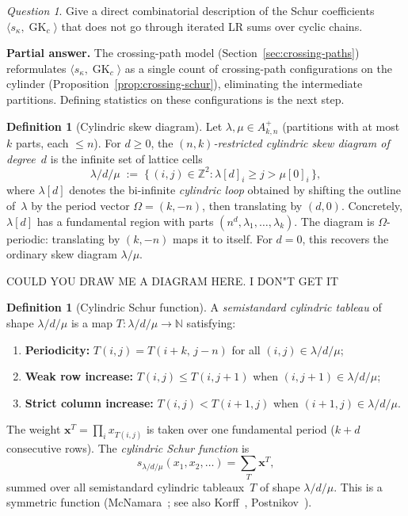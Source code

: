 \documentclass[11pt]{article}
\theoremstyle{plain}
\theoremstyle{definition}
\newtheorem{definition}[theorem]{Definition}
\theoremstyle{remark}
\newtheorem{question}[theorem]{Question}
\newcommand{\N}{\mathbb{N}}
\newcommand{\Z}{\mathbb{Z}}
\newcommand{\GK}{\operatorname{GK}}
\begin{document}
\begin{question}\label{q:schur-coeffs-natural}
Give a direct combinatorial description of the Schur coefficients
$\langle s_\kappa, \GK_c \rangle$ that does not go through
iterated LR sums over cyclic chains.
\end{question}

\noindent
\textbf{Partial answer.}
The crossing-path model (Section~\ref{sec:crossing-paths})
reformulates $\langle s_\kappa, \GK_c \rangle$ as a single
count of crossing-path configurations on the cylinder
(Proposition~\ref{prop:crossing-schur}), eliminating the
intermediate partitions.  Defining statistics on these
configurations is the next step.

\begin{definition}[Cylindric skew diagram]\label{def:cyl-diagram}
Let $\lambda, \mu \in A^+_{k,n}$ (partitions with at most $k$ parts,
each $\leq n$).  For $d \geq 0$, the \emph{$(n,k)$-restricted
cylindric skew diagram of degree~$d$} is the infinite set of
lattice cells
\[
  \lambda/d/\mu
  \;:=\; \bigl\{\, (i,j) \in \Z^2 :
    \lambda[d]_i \geq j > \mu[0]_i \,\bigr\},
\]
where $\lambda[d]$ denotes the bi-infinite \emph{cylindric loop}
obtained by shifting the outline of~$\lambda$ by the period vector
$\Omega = (k, -n)$, then translating by $(d,0)$.
Concretely, $\lambda[d]$ has a fundamental region with parts
$(n^d, \lambda_1, \ldots, \lambda_k)$.  The diagram is
$\Omega$-periodic: translating by $(k, -n)$ maps it to itself.
For $d = 0$, this recovers the ordinary skew diagram $\lambda/\mu$.
\end{definition}

COULD YOU DRAW ME A DIAGRAM HERE. I DON"T GET IT

\begin{definition}[Cylindric Schur function]\label{def:cyl-schur}
A \emph{semistandard cylindric tableau} of shape $\lambda/d/\mu$
is a map $T : \lambda/d/\mu \to \N$ satisfying:
\begin{enumerate}
\item \textbf{Periodicity:}
  $T(i,j) = T(i+k,\, j-n)$ for all $(i,j) \in \lambda/d/\mu$;
\item \textbf{Weak row increase:}
  $T(i,j) \leq T(i,j+1)$ when $(i,j+1) \in \lambda/d/\mu$;
\item \textbf{Strict column increase:}
  $T(i,j) < T(i+1,j)$ when $(i+1,j) \in \lambda/d/\mu$.
\end{enumerate}
The weight $\mathbf{x}^T = \prod_i x_{T(i,j)}$ is taken over one
fundamental period ($k+d$ consecutive rows).
The \emph{cylindric Schur function} is
\[
  s_{\lambda/d/\mu}(x_1, x_2, \ldots)
  = \sum_T \mathbf{x}^T,
\]
summed over all semistandard cylindric tableaux~$T$ of shape
$\lambda/d/\mu$.  This is a symmetric function
(McNamara~\cite{mcnamara-2006}; see also Korff~\cite{korff-2011},
Postnikov~\cite{postnikov-2005}).
\end{definition}
\end{document}
